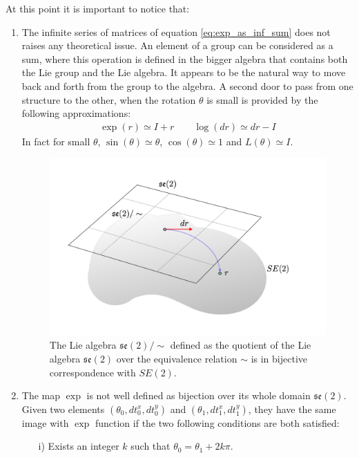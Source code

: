At this point it is important to notice that: 
\begin{enumerate}
	\item The infinite series of matrices of equation \ref{eq:exp_as_inf_sum} does not raises any theoretical issue. An element of a group can be considered as a sum, where this operation is defined in the bigger algebra that contains both the Lie group and the Lie algebra. It appears to be the natural way to move back and forth from the group to the algebra. A second door to pass from one structure to the other, when the rotation $\theta$ is small is provided by the following approximations:
	\begin{align}\label{eq:small_rotation_matrices_approx}
	\exp(r) \simeq I + r
	\qquad 
	\log(dr) \simeq dr - I
	\end{align}
	In fact for small $\theta$, $\sin(\theta) \simeq \theta$, $\cos(\theta) \simeq 1 $ and $ L(\theta) \simeq I$.
	\begin{figure}[!ht]
		\centering
		\includegraphics[scale=0.35]{figures/exp_se2.pdf}
		\caption{The Lie algebra $\mathfrak{se}(2)/\sim$ defined as the quotient of the Lie algebra $\mathfrak{se}(2)$ over the equivalence relation $\sim$ is in bijective correspondence with $SE(2)$.}
		\label{fig:exp_se2}
	\end{figure}
	\item The map $\exp$ is not well defined as bijection over its whole domain $\mathfrak{se}(2)$. Given two elements $(\theta_0, dt^{x}_0, dt^{y}_0)$ and $(\theta_1, dt^{x}_1, dt^{y}_1)$, they have the same image with $\exp$ function if the two following conditions are both satisfied:
	\begin{enumerate}
		\item[i)] Exists an integer $k$ such that $\theta_0 = \theta_1 + 2k\pi$.

\end{enumerate}
\end{enumerate}
